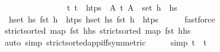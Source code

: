 \begin{isabellebody}
\ \ \ \ \ \ \ \ \ \ \ \ \ \ \ \ {\isachardoublequoteopen}{\isasymAnd}t{\isachardot}{\kern0pt}\ t\ {\isasymin}\ htps\ {\isasymLongrightarrow}\ {\isasymexists}A{\isachardot}{\kern0pt}\ {\isacharparenleft}{\kern0pt}t{\isacharcomma}{\kern0pt}\ A{\isacharparenright}{\kern0pt}\ {\isasymin}\ set\ {\isacharparenleft}{\kern0pt}h{\isacharprime}{\kern0pt}\ {\isacharhash}{\kern0pt}\ hs{}{\isacharprime}{\kern0pt}{\isacharparenright}{\kern0pt}{\isachardoublequoteclose}\isanewline
\ \ \ \ \isamarkupfalse%
\ {}{\isacharparenleft}{\kern0pt}{}{\isacharcomma}{\kern0pt}{}{\isacharparenright}{\kern0pt}\ {\isacartoucheopen}{\isacharparenleft}{\kern0pt}{\isasymforall}h{\isasymin}set\ hs{}{\isachardot}{\kern0pt}\ fst\ h\ {\isasymnotin}\ htps{\isacharparenright}{\kern0pt}{\isacartoucheclose}\ {\isacartoucheopen}{\isacharparenleft}{\kern0pt}{\isasymforall}h{\isasymin}set\ hs{}{\isacharprime}{\kern0pt}{\isachardot}{\kern0pt}\ fst\ h\ {\isasymnotin}\ htps{\isacharparenright}{\kern0pt}{\isacartoucheclose}\isanewline
\ \ \ \ \isamarkupfalse%
\ fastforce{\isacharplus}{\kern0pt}\isanewline
\ \ \isamarkupfalse%
\ \isamarkupfalse%
\ {\isachardoublequoteopen}strict{\isacharunderscore}{\kern0pt}sorted\ {\isacharparenleft}{\kern0pt}map\ fst\ {\isacharparenleft}{\kern0pt}h{\isacharhash}{\kern0pt}hs{}{\isacharparenright}{\kern0pt}{\isacharparenright}{\kern0pt}{\isachardoublequoteclose}\ {\isachardoublequoteopen}strict{\isacharunderscore}{\kern0pt}sorted\ {\isacharparenleft}{\kern0pt}map\ fst\ {\isacharparenleft}{\kern0pt}h{\isacharprime}{\kern0pt}{\isacharhash}{\kern0pt}hs{}{\isacharprime}{\kern0pt}{\isacharparenright}{\kern0pt}{\isacharparenright}{\kern0pt}{\isachardoublequoteclose}\isanewline
\ \ \ \ \isamarkupfalse%
\ {}{\isacharparenleft}{\kern0pt}{}{\isacharcomma}{\kern0pt}{}{\isacharparenright}{\kern0pt}\ \isanewline
\ \ \ \ \isamarkupfalse%
\ {\isacharparenleft}{\kern0pt}auto\ simp{\isacharcolon}{\kern0pt}\ strict{\isacharunderscore}{\kern0pt}sorted{\isacharunderscore}{\kern0pt}app{\isacharunderscore}{\kern0pt}iff{\isacharbrackleft}{\kern0pt}symmetric{\isacharbrackright}{\kern0pt}{\isacharparenright}{\kern0pt}\isanewline
\ \ \isamarkupfalse%
\ \isamarkupfalse%
\ {\isacharbrackleft}{\kern0pt}simp{\isacharbrackright}{\kern0pt}{\isacharcolon}{\kern0pt}\ {\isachardoublequoteopen}t\ {\isacharequal}{\kern0pt}\ t{\isacharprime}{\kern0pt}{\isachardoublequoteclose}\isanewline

\end{isabellebody}
